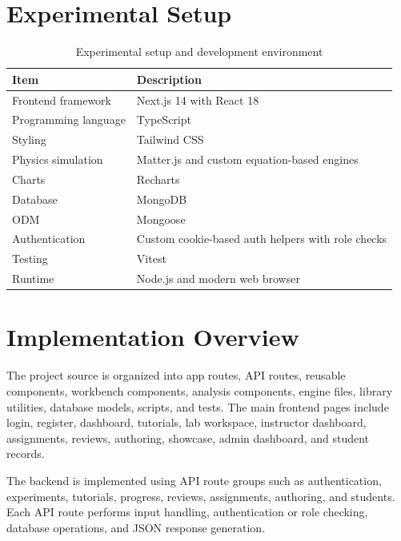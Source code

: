 \documentclass[12pt,a4paper]{report}
\begin{document}
\section{Experimental Setup}
\begin{table}[H]
\centering
\caption{Experimental setup and development environment}
\begin{tabular}{p{} p{}}
\toprule
\textbf{Item} & \textbf{Description} \\
\midrule
Frontend framework & Next.js 14 with React 18 \\
Programming language & TypeScript \\
Styling & Tailwind CSS \\
Physics simulation & Matter.js and custom equation-based engines \\
Charts & Recharts \\
Database & MongoDB \\
ODM & Mongoose \\
Authentication & Custom cookie-based auth helpers with role checks \\
Testing & Vitest \\
Runtime & Node.js and modern web browser \\
\bottomrule
\end{tabular}
\end{table}

\section{Implementation Overview}
The project source is organized into app routes, API routes, reusable components, workbench components, analysis components, engine files, library utilities, database models, scripts, and tests. The main frontend pages include login, register, dashboard, tutorials, lab workspace, instructor dashboard, assignments, reviews, authoring, showcase, admin dashboard, and student records.

The backend is implemented using API route groups such as authentication, experiments, tutorials, progress, reviews, assignments, authoring, and students. Each API route performs input handling, authentication or role checking, database operations, and JSON response generation.
\end{document}
